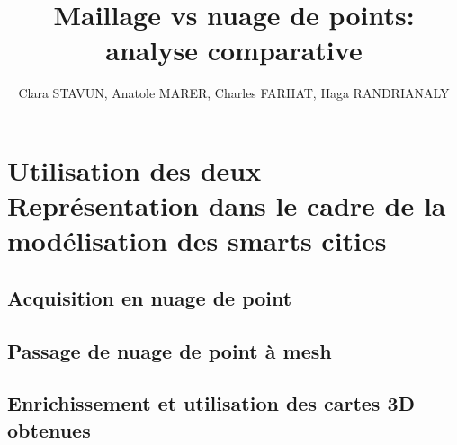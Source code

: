 \documentclass{report}
\author{Clara STAVUN, Anatole MARER, Charles FARHAT, Haga RANDRIANALY}
\title{Maillage vs nuage de points: analyse comparative}
\begin{document}
\maketitle

\tableofcontents





\chapter{Utilisation des deux Représentation dans le cadre de la modélisation des smarts cities}

\section{Acquisition en nuage de point}

\section{Passage de nuage de point à mesh}

\section{Enrichissement et utilisation des cartes 3D obtenues}


\end{document}
